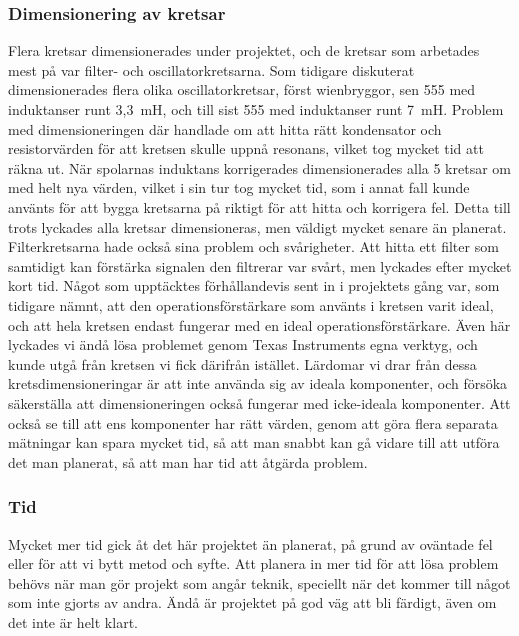 \documentclass[a4paper]{article}
\makeatletter
\let\\\@raggedtwoe@savedcr%
\makeatother
\begin{document}
\begin{sloppypar}
    \subsubsection{Dimensionering av kretsar}
    Flera kretsar dimensionerades under projektet, och de kretsar som arbetades mest på var filter- och oscillatorkretsarna.
    Som tidigare diskuterat dimensionerades flera olika oscillatorkretsar, först wienbryggor, sen 555 med induktanser runt 3,3~mH, och till sist 555 med induktanser runt 7~mH.
    Problem med dimensioneringen där handlade om att hitta rätt kondensator och resistorvärden för att kretsen skulle uppnå resonans, vilket tog mycket tid att räkna ut.
    När spolarnas induktans korrigerades dimensionerades alla 5 kretsar om med helt nya värden, vilket i sin tur tog mycket tid, som i annat fall kunde använts för att bygga kretsarna på riktigt för att hitta och korrigera fel.
    Detta till trots lyckades alla kretsar dimensioneras, men väldigt mycket senare än planerat.
    \\\\
    Filterkretsarna hade också sina problem och svårigheter. Att hitta ett filter som samtidigt kan förstärka signalen den filtrerar var svårt, men lyckades efter mycket kort tid. Något som upptäcktes förhållandevis sent in i projektets gång var, som tidigare nämnt, att den operationsförstärkare som använts i kretsen varit ideal, och att hela kretsen endast fungerar med en ideal operationsförstärkare.
    Även här lyckades vi ändå lösa problemet genom Texas Instruments egna verktyg, och kunde utgå från kretsen vi fick därifrån istället.
    \\\\
    Lärdomar vi drar från dessa kretsdimensioneringar är att inte använda sig av ideala komponenter, och försöka säkerställa att dimensioneringen också fungerar med icke-ideala komponenter. Att också se till att ens komponenter har rätt värden, genom att göra flera separata mätningar kan spara mycket tid, så att man snabbt kan gå vidare till att utföra det man planerat, så att man har tid att åtgärda problem.

    \subsubsection{Tid}
    Mycket mer tid gick åt det här projektet än planerat, på grund av oväntade fel eller för att vi bytt metod och syfte. Att planera in mer tid för att lösa problem behövs när man gör projekt som angår teknik, speciellt när det kommer till något som inte gjorts av andra. Ändå är projektet på god väg att bli färdigt, även om det inte är helt klart.


\end{sloppypar}
\end{document}
